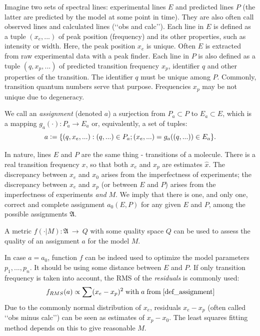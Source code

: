 \documentclass[11pt]{article}
\begin{document}

Imagine two sets of spectral lines: experimental lines $E$ and predicted lines $P$ (the latter are predicted by the model at some point in time). They are also often call observed lines and calculated lines (\lq\lq{}obs and calc\rq\rq{}). Each  line in $E$ is defined as a tuple $(x_e, ...)$ of peak position (frequency) and its other properties, such as intensity or width. Here, the peak position $x_e$ is unique. Often $E$ is extracted from raw experimental data with a peak finder. Each line in $P$ is also defined as a tuple $(q, x_p, ...)$ of predicted transition frequency $x_p$, identifier $q$ and other properties of the transition. The identifier $q$ must be unique among $P$. Commonly, transition quantum numbers serve that purpose. Frequencies $x_p$ may be not unique due to degeneracy. 

We call an \emph{assignment} (denoted $a$) a surjection from $P_a \subset P$ to $E_a \subset E$, which is a mapping $g_a(\cdot): P_a \rightarrow E_a$ or, equivalently, a set of tuples: 
\begin{equation}
\label{def_assignment}
	a \vcentcolon= \{(q, x_e, ...): (q, ...) \in P_a; (x_e, ...) = g_a((q, ...)) \in E_a\}.
\end{equation}

In nature, lines $E$ and $P$ are the same thing - transitions of a molecule. There is a real transition frequency $x$, so that both $x_e$ and $x_p$ are estimates $\hat x$. The discrepancy between  $x_e$ and $x_0$ arises from the imperfectness of experiments; the discrepancy between $x_e$ and $x_p$ (or between $E$ and $P$) arises from the imperfectness of experiments \emph{and} $M$. We imply that there is one, and only one, correct and complete assignment $a_0(E, P)$ for any given $E$ and $P$, among the possible assignments $\mathfrak{A}$. 

A metric $f(\cdot | M): \mathfrak{A}~\rightarrow~Q$ with some quality space $Q$ can be used to assess the quality of an assignment $a$ for the model $M$. %

In case $a = a_0$, function $f$ can be indeed used to optimize the model parameters $p_1, ..., p_n$. It should be using some distance between $E$ and $P$. If only transition frequency is taken into account, the RMS of the \emph{residuals} is commonly used:
\begin{equation}
\label{def_rms}
	f_{RMS}(a) \propto \sum (x_e - x_p)^2\;{\rm with}\;a\;{\rm from}\;\ref{def_assignment}
\end{equation}
Due to the commonly normal distribution of $x_e$, residuals $x_e - x_p$ (often called \lq\lq{}obs minus calc\rq\rq{}) can be seen as estimates of $x_p - x_0$. The least squares fitting method depends on this to give reasonable $M$. 
\end{document}

